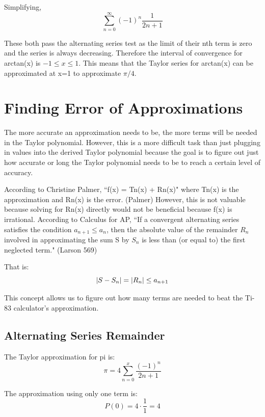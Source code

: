 \documentclass[12pt, titlepage]{article}
\begin{document}
Simplifying,
\begin{equation}
    \sum_{n=0}^{\infty} (-1)^{n} \frac{1}{2n+1}
\end{equation}

These both pass the alternating series test as the limit of their nth term is zero and the series is always decreasing. Therefore the interval of convergence for arctan(x) is \( -1 \leq x \leq 1 \). This means that the Taylor series for arctan(x) can be approximated at x=1 to approximate \(\pi/4\).

\section{Finding Error of Approximations}
The more accurate an approximation needs to be, the more terms will be needed in the Taylor polynomial. However, this is a more difficult task than just plugging in values into the derived Taylor polynomial because the goal is to figure out just how accurate or long the Taylor polynomial needs to be to reach a certain level of accuracy.

According to Christine Palmer, ``f(x) = Tn(x) + Rn(x)" where Tn(x) is the approximation and Rn(x) is the error. (Palmer) However, this is not valuable because solving for Rn(x) directly would not be beneficial because f(x) is irrational.
According to Calculus for AP, ``If a convergent alternating series satisfies the condition \(a_{n+1} \leq a_{n} \), then the absolute value of the remainder \(R_{n}\) involved in approximating the sum S by \(S_{n}\) is less than (or equal to) the first neglected term." (Larson 569)

That is:
\begin{equation}
  \abs{S - S_{n}} = \abs{R_{n}} \leq a_{n + 1}
\end{equation}

This concept allows us to figure out how many terms are needed to beat the Ti-83 calculator's approximation.

\subsection{Alternating Series Remainder}
The Taylor approximation for pi is:
\begin{equation}
  \pi = 4\sum_{n=0}^{x}{ \frac{(-1)^n}{2n+1}}
\end{equation}

The approximation using only one term is:
\begin{equation}
  P(0) = 4 \cdot \frac{1}{1} = 4
\end{equation}
\end{document}
